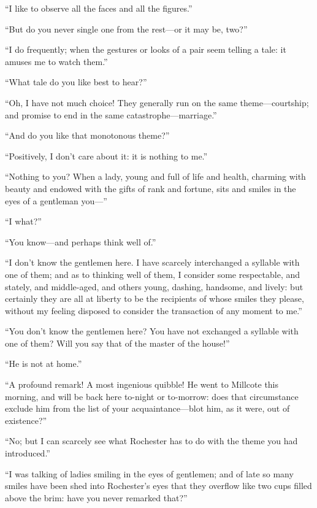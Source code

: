 \enquote{I like to observe all the faces and all the figures.}

\enquote{But do you never single one from the rest---or it may be, two?}

\enquote{I do frequently; when the gestures or looks of a pair seem
telling a tale: it amuses me to watch them.}

\enquote{What tale do you like best to hear?}

\enquote{Oh, I have not much choice! They generally run on the same
theme---courtship; and promise to end in the same
catastrophe---marriage.}

\enquote{And do you like that monotonous theme?}

\enquote{Positively, I don't care about it: it is nothing to me.}

\enquote{Nothing to you? When a lady, young and full of life and
health, charming with beauty and endowed with the gifts of rank and
fortune, sits and smiles in the eyes of a gentleman you---}

\enquote{I what?}

\enquote{You know---and perhaps think well of.}

\enquote{I don't know the gentlemen here. I have scarcely interchanged
a syllable with one of them; and as to thinking well of them, I consider
some respectable, and stately, and middle-aged, and others young,
dashing, handsome, and lively: but certainly they are all at liberty to
be the recipients of whose smiles they please, without my feeling
disposed to consider the transaction of any moment to me.}

\enquote{You don't know the gentlemen here? You have not exchanged a
syllable with one of them? Will you say that of the master of the
house!}

\enquote{He is not at home.}

\enquote{A profound remark! A most ingenious quibble! He went to
Millcote this morning, and will be back here to-night or to-morrow: does
that circumstance exclude him from the list of your acquaintance---blot
him, as it were, out of existence?}

\enquote{No; but I can scarcely see what \Mr{} Rochester has to do with
the theme you had introduced.}

\enquote{I was talking of ladies smiling in the eyes of gentlemen; and
of late so many smiles have been shed into \Mr{} Rochester's eyes that
they overflow like two cups filled above the brim: have you never
remarked that?}

